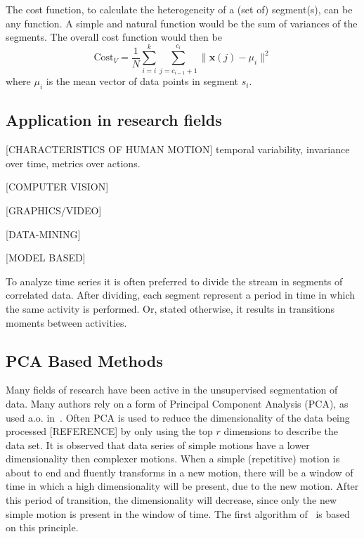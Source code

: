 The cost function, to calculate the heterogeneity of a (set of) segment(s), can be any function.
A simple and natural function would be the sum of variances of the segments.
The overall cost function would then be
\begin{equation}
	\label{eq:cost_variances}
	\mathrm{Cost}_V = \frac{1}{N} \sum_{i=i}^{k} \sum_{j=c_{i-1}+1}^{c_i} \|
	\mathbf{x}(j) - \mu_i \|^2
\end{equation}
where $\mu_i$ is the mean vector of data points in segment $s_i$.

\subsection{Application in research fields}

[CHARACTERISTICS OF HUMAN MOTION]
temporal variability, invariance over time, metrics over actions.

[COMPUTER VISION]

[GRAPHICS/VIDEO]

[DATA-MINING]

[MODEL BASED]

To analyze time series it is often preferred to divide the stream in segments of correlated data.
After dividing, each segment represent a period in time in which the same activity is performed.
Or, stated otherwise, it results in transitions moments between activities.

\subsection{PCA Based Methods}

Many fields of research have been active in the unsupervised segmentation of data.
Many authors rely on a form of Principal Component Analysis (PCA), as used a.o. in~\cite{barbivc2004segmenting}.
Often PCA is used to reduce the dimensionality of the data being processed [REFERENCE] by only using the top $r$ dimensions to describe the data set.
It is observed that data series of simple motions have a lower dimensionality then complexer motions.
When a simple (repetitive) motion is about to end and fluently transforms in a new motion, there will be a window of time in which a high dimensionality will be present, due to the new motion.
After this period of transition, the dimensionality will decrease, since only the new simple motion is present in the window of time.
The first algorithm of~\cite{barbivc2004segmenting} is based on this principle.


